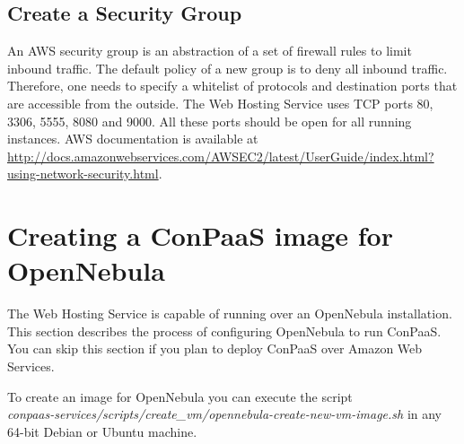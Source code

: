 \documentclass[10pt]{article}
\begin{document}
\subsection{Create a Security Group}

An AWS security group is an abstraction of a set of firewall rules to
limit inbound traffic. The default policy of a new group is to deny
all inbound traffic. Therefore, one needs to specify a whitelist of
protocols and destination ports that are accessible from the outside.
The Web Hosting Service uses TCP ports 80, 3306, 5555, 8080 and 9000. All
these ports should be open for all running instances.  AWS
documentation is available at
\url{http://docs.amazonwebservices.com/AWSEC2/latest/UserGuide/index.html?using-network-security.html}.

\section{Creating a ConPaaS image for OpenNebula}
\label{sec:oneimage}

The Web Hosting Service is capable of running over an OpenNebula
installation. This section describes the process of configuring
OpenNebula to run ConPaaS. You can skip this section if you plan to
deploy ConPaaS over Amazon Web Services.

To create an image for OpenNebula you can execute the script\\
\textit{conpaas-services/scripts/create\_vm/opennebula-create-new-vm-image.sh} in any
64-bit Debian or Ubuntu machine.
\end{document}

